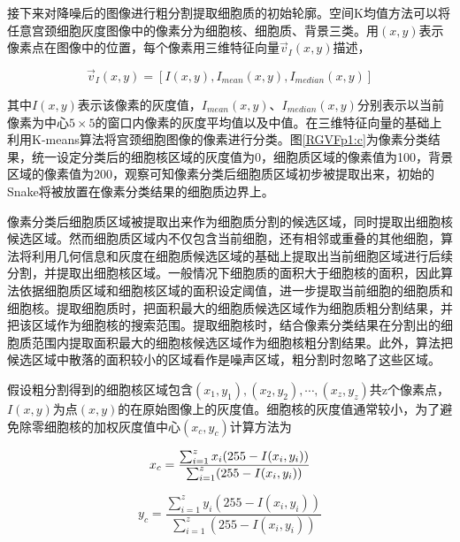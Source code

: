 \documentclass[nomlist,masters]{seuthesix}
\begin{document}
接下来对降噪后的图像进行粗分割提取细胞质的初始轮廓。空间K均值方法可以将任意宫颈细胞灰度图像中的像素分为细胞核、细胞质、背景三类。用$(x,y)$表示像素点在图像中的位置，每个像素用三维特征向量$\vec{v}_{I}(x,y)$描述，

\begin{equation}
\vec{v}_{I}(x,y)=\left [ I(x,y),I_{mean}(x,y),I_{median}(x,y) \right ]
\label{RGVFv}
\end{equation}

其中$I(x,y)$表示该像素的灰度值，$I_{mean}(x,y)$、$I_{median}(x,y)$分别表示以当前像素为中心$5 \times 5$的窗口内像素的灰度平均值以及中值。在三维特征向量的基础上利用K-means算法将宫颈细胞图像的像素进行分类。图\ref{RGVFp1:c}为像素分类结果，统一设定分类后的细胞核区域的灰度值为0，细胞质区域的像素值为100，背景区域的像素值为200，观察可知像素分类后细胞质区域初步被提取出来，初始的Snake将被放置在像素分类结果的细胞质边界上。

像素分类后细胞质区域被提取出来作为细胞质分割的候选区域，同时提取出细胞核候选区域。然而细胞质区域内不仅包含当前细胞，还有相邻或重叠的其他细胞，算法将利用几何信息和灰度在细胞质候选区域的基础上提取出当前细胞区域进行后续分割，并提取出细胞核区域。一般情况下细胞质的面积大于细胞核的面积，因此算法依据细胞质区域和细胞核区域的面积设定阈值，进一步提取当前细胞的细胞质和细胞核。提取细胞质时，把面积最大的细胞质候选区域作为细胞质粗分割结果，并把该区域作为细胞核的搜索范围。提取细胞核时，结合像素分类结果在分割出的细胞质范围内提取面积最大的细胞核候选区域作为细胞核粗分割结果。此外，算法把候选区域中散落的面积较小的区域看作是噪声区域，粗分割时忽略了这些区域。

假设粗分割得到的细胞核区域包含$(x_{1},y_{1}),(x_{2},y_{2}),\cdots ,(x_{z},y_{z})$共z个像素点，$I(x,y)$为点$(x,y)$的在原始图像上的灰度值。细胞核的灰度值通常较小，为了避免除零细胞核的加权灰度值中心$(x_{c},y_{c})$计算方法为

\begin{equation}
x_{c}=\frac{\sum_{i=1}^{z}x_{i}(255-I(x_{i},y_{i}))}{\sum_{i=1}^{z}(255-I(x_{i},y_{i}))}\\ 
\label{RGVFcentroidx}
\end{equation}

\begin{equation}
y_{c}=\frac{\sum_{i=1}^{z}y_{i}(255-I(x_{i},y_{i}))}{\sum_{i=1}^{z}(255-I(x_{i},y_{i}))}
\label{RGVFcentroidy}
\end{equation}
\end{document}
